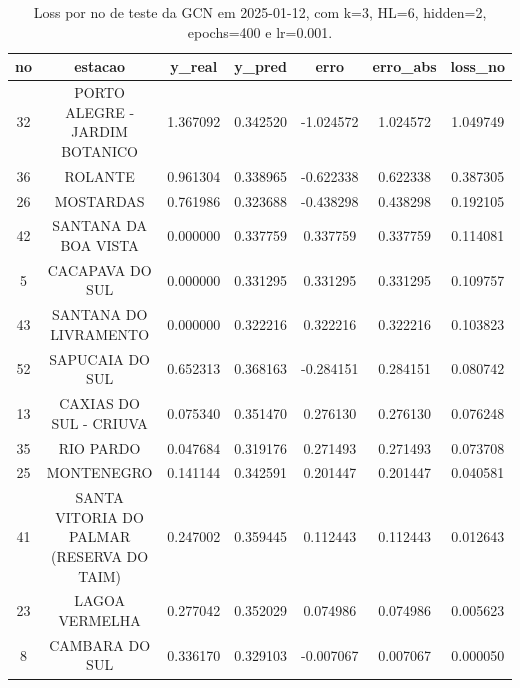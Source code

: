 \begin{table}[h]
\centering
\caption{Loss por no de teste da GCN em 2025-01-12, com k=3, HL=6, hidden=2, epochs=400 e lr=0.001.}
\label{tab:gcn_loss_k3_hl6_h2_e400_d20250112}
\begin{tabular}{ccccccc}
\toprule
no & estacao & y\_real & y\_pred & erro & erro\_abs & loss\_no \\
\midrule
32 & PORTO ALEGRE - JARDIM BOTANICO & 1.367092 & 0.342520 & -1.024572 & 1.024572 & 1.049749 \\
36 & ROLANTE & 0.961304 & 0.338965 & -0.622338 & 0.622338 & 0.387305 \\
26 & MOSTARDAS & 0.761986 & 0.323688 & -0.438298 & 0.438298 & 0.192105 \\
42 & SANTANA DA BOA VISTA & 0.000000 & 0.337759 & 0.337759 & 0.337759 & 0.114081 \\
5 & CACAPAVA DO SUL & 0.000000 & 0.331295 & 0.331295 & 0.331295 & 0.109757 \\
43 & SANTANA DO LIVRAMENTO & 0.000000 & 0.322216 & 0.322216 & 0.322216 & 0.103823 \\
52 & SAPUCAIA DO SUL & 0.652313 & 0.368163 & -0.284151 & 0.284151 & 0.080742 \\
13 & CAXIAS DO SUL - CRIUVA & 0.075340 & 0.351470 & 0.276130 & 0.276130 & 0.076248 \\
35 & RIO PARDO & 0.047684 & 0.319176 & 0.271493 & 0.271493 & 0.073708 \\
25 & MONTENEGRO & 0.141144 & 0.342591 & 0.201447 & 0.201447 & 0.040581 \\
41 & SANTA VITORIA DO PALMAR (RESERVA DO TAIM) & 0.247002 & 0.359445 & 0.112443 & 0.112443 & 0.012643 \\
23 & LAGOA VERMELHA & 0.277042 & 0.352029 & 0.074986 & 0.074986 & 0.005623 \\
8 & CAMBARA DO SUL & 0.336170 & 0.329103 & -0.007067 & 0.007067 & 0.000050 \\
\bottomrule
\end{tabular}
\end{table}
